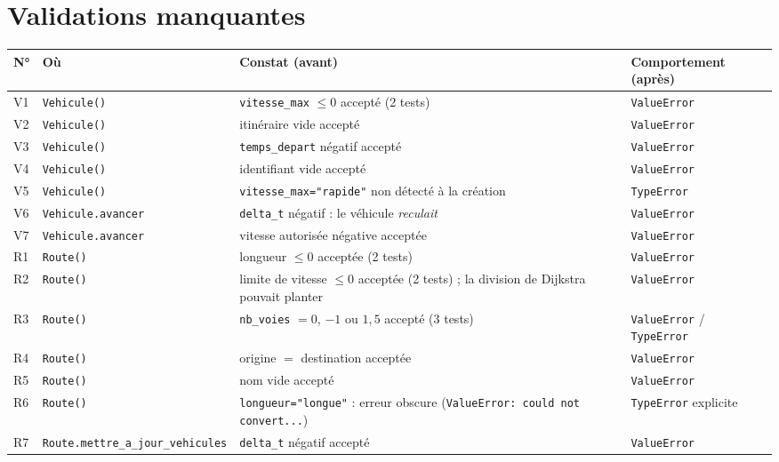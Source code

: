 \documentclass[12pt,a4paper]{report}
\begin{document}
\section{Validations manquantes}
\begin{table}[H]\centering\small
\begin{tabular}{@{}l >{\raggedright\arraybackslash}p{3.9cm} >{\raggedright\arraybackslash}p{4.4cm} >{\raggedright\arraybackslash}p{3.6cm}@{}}
\toprule
\textbf{N°} & \textbf{Où} & \textbf{Constat (avant)} & \textbf{Comportement (après)} \\ \midrule
V1 & \texttt{Vehicule()} & \texttt{vitesse\_\allowbreak{}max} $\le 0$ accepté (2 tests) & \texttt{ValueError} \\
V2 & \texttt{Vehicule()} & itinéraire vide accepté & \texttt{ValueError} \\
V3 & \texttt{Vehicule()} & \texttt{temps\_\allowbreak{}depart} négatif accepté & \texttt{ValueError} \\
V4 & \texttt{Vehicule()} & identifiant vide accepté & \texttt{ValueError} \\
V5 & \texttt{Vehicule()} & \texttt{vitesse\_\allowbreak{}max="rapide"} non détecté à la création & \texttt{TypeError} \\
V6 & \texttt{Vehicule.\allowbreak{}avancer} & \texttt{delta\_\allowbreak{}t} négatif : le véhicule \emph{reculait} & \texttt{ValueError} \\
V7 & \texttt{Vehicule.\allowbreak{}avancer} & vitesse autorisée négative acceptée & \texttt{ValueError} \\ \midrule
R1 & \texttt{Route()} & longueur $\le 0$ acceptée (2 tests) & \texttt{ValueError} \\
R2 & \texttt{Route()} & limite de vitesse $\le 0$ acceptée (2 tests) ; la division de Dijkstra pouvait planter & \texttt{ValueError} \\
R3 & \texttt{Route()} & \texttt{nb\_\allowbreak{}voies} $=0$, $-1$ ou $1{,}5$ accepté (3 tests) & \texttt{ValueError} / \texttt{TypeError} \\
R4 & \texttt{Route()} & origine $=$ destination acceptée & \texttt{ValueError} \\
R5 & \texttt{Route()} & nom vide accepté & \texttt{ValueError} \\
R6 & \texttt{Route()} & \texttt{longueur="longue"} : erreur obscure (\texttt{ValueError: could not convert...}) & \texttt{TypeError} explicite \\
R7 & \texttt{Route.\allowbreak{}mettre\_\allowbreak{}a\_\allowbreak{}jour\_\allowbreak{}vehicules} & \texttt{delta\_\allowbreak{}t} négatif accepté & \texttt{ValueError} \\ \midrule

\end{tabular}
\end{table}
\end{document}
